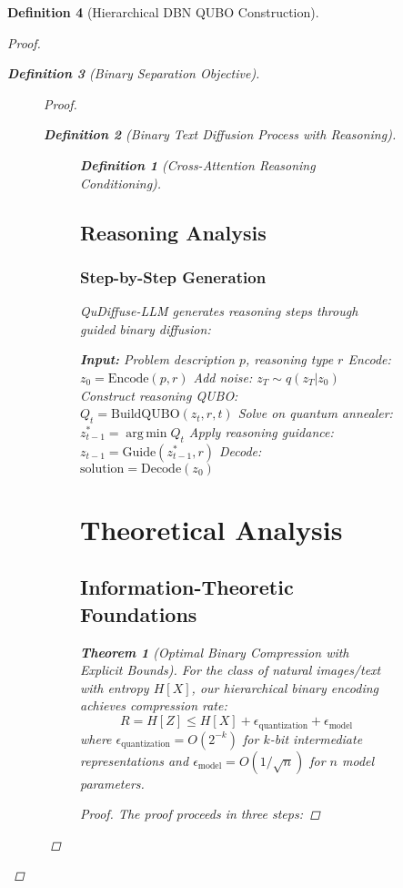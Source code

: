 \documentclass{article}
\newtheorem{theorem}{Theorem}
\newtheorem{definition}{Definition}
\DeclareMathOperator*{\argmin}{arg\,min}
\begin{document}
\begin{definition}[Hierarchical DBN QUBO Construction]
\begin{proof}
\begin{definition}[Binary Separation Objective]
\begin{figure}[H]
\begin{proof}
\begin{definition}[Binary Text Diffusion Process with Reasoning]
\begin{figure}[H]
\begin{definition}[Cross-Attention Reasoning Conditioning]
\subsection{Reasoning Analysis}

\subsubsection{Step-by-Step Generation}

QuDiffuse-LLM generates reasoning steps through guided binary diffusion:

\begin{algorithm}
\caption{Quantum-Guided Reasoning Generation}
\begin{algorithmic}[1]
\STATE \textbf{Input:} Problem description $p$, reasoning type $r$
\STATE Encode: $z_0 = \text{Encode}(p, r)$
\STATE Add noise: $z_T \sim q(z_T | z_0)$
    \STATE Construct reasoning QUBO: $Q_t = \text{BuildQUBO}(z_t, r, t)$
    \STATE Solve on quantum annealer: $z_{t-1}^* = \argmin Q_t$
    \STATE Apply reasoning guidance: $z_{t-1} = \text{Guide}(z_{t-1}^*, r)$
\ENDFOR
\STATE Decode: $\text{solution} = \text{Decode}(z_0)$
\end{algorithmic}
\end{algorithm}

\section{Theoretical Analysis}

\subsection{Information-Theoretic Foundations}

\begin{theorem}[Optimal Binary Compression with Explicit Bounds]
For the class of natural images/text with entropy $H[X]$, our hierarchical binary encoding achieves compression rate:
\begin{equation}
R = H[Z] \leq H[X] + \epsilon_{\text{quantization}} + \epsilon_{\text{model}}
\end{equation}
where $\epsilon_{\text{quantization}} = O(2^{-k})$ for $k$-bit intermediate representations and $\epsilon_{\text{model}} = O(1/\sqrt{n})$ for $n$ model parameters.
\end{theorem}

\begin{proof}
The proof proceeds in three steps:


\end{proof}
\end{definition}
\end{figure}
\end{definition}
\end{proof}
\end{figure}
\end{definition}
\end{proof}
\end{definition}
\end{document}
